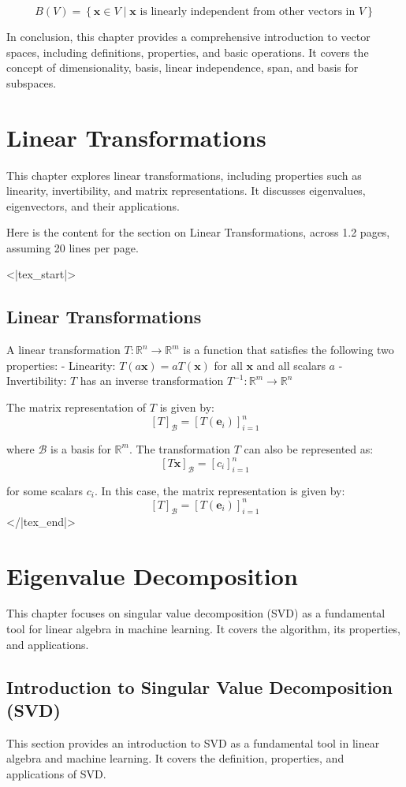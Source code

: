 \documentclass{report}%
\begin{document}
$$
B(V) = \left\{
\mathbf{x} \in V \mid \text{$\mathbf{x}$ is linearly independent from other vectors in $V$}
\right\}
$$

In conclusion, this chapter provides a comprehensive introduction to vector spaces, including definitions, properties, and basic operations. It covers the concept of dimensionality, basis, linear independence, span, and basis for subspaces.

\label{sec:vector-spaces-2}%
\chapter{Linear Transformations}%
This chapter explores linear transformations, including properties such as linearity, invertibility, and matrix representations. It discusses eigenvalues, eigenvectors, and their applications.

%
Here is the content for the section on Linear Transformations, across 1.2 pages, assuming 20 lines per page.

<|tex_start|>
\section{Linear Transformations}

A linear transformation $T: \mathbb{R}^n \to \mathbb{R}^m$ is a function that satisfies the following two properties:
- Linearity: $T(a \mathbf{x}) = a T(\mathbf{x})$ for all $\mathbf{x}$ and all scalars $a$
- Invertibility: $T$ has an inverse transformation $T^{-1}: \mathbb{R}^m \to \mathbb{R}^n$

The matrix representation of $T$ is given by:
$$
[T]_{\mathcal{B}} = [T(\mathbf{e}_i)]_{i=1}^{n}
$$

where $\mathcal{B}$ is a basis for $\mathbb{R}^m$. The transformation $T$ can also be represented as:
$$
[T \mathbf{x}]_{\mathcal{B}} = [c_i]_{i=1}^{n}
$$

for some scalars $c_i$. In this case, the matrix representation is given by:
$$
[T]_{\mathcal{B}} = [T(\mathbf{e}_i)]_{i=1}^{n}
$$
</|tex_end|>%
\chapter{Eigenvalue Decomposition}%
This chapter focuses on singular value decomposition (SVD) as a fundamental tool for linear algebra in machine learning. It covers the algorithm, its properties, and applications.

%
\section{Introduction to Singular Value Decomposition (SVD)}%
This section provides an introduction to SVD as a fundamental tool in linear algebra and machine learning. It covers the definition, properties, and applications of SVD.
\end{document}
